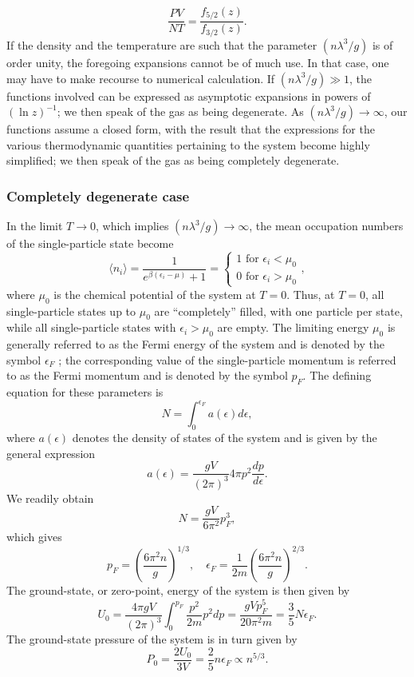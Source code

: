 \[\frac{PV}{NT} = \frac{f_{5/2}(z)}{f_{3/2}(z)}.\]
If the density and the temperature are such that the parameter $(n\lambda^3/g)$ is of order unity, the foregoing expansions cannot be of much use. In that case, one may have to make recourse to numerical calculation.
If $(n\lambda^3/g) \gg 1$, the functions involved can be expressed as asymptotic expansions in powers of $(\ln z)^{-1}$; we then speak of the gas as being degenerate.
As $(n\lambda^3/g) \to \infty$, our functions assume a closed form, with the result that the expressions for the various thermodynamic quantities pertaining to the system become highly simplified; we then speak of the gas as being completely degenerate.

\subsubsection{Completely degenerate case}
In the limit $T \to 0$, which implies $(n\lambda^3/g) \to \infty$, the mean occupation numbers of the single-particle state become
\[\langle n_i \rangle = \frac{1}{e^{\beta(\epsilon_i - \mu)} + 1} = \begin{cases}1 \mbox{ for } \epsilon_i < \mu_0 \\   0 \mbox{ for } \epsilon_i > \mu_0 \end{cases},\]
where $\mu_0$ is the chemical potential of the system at $T = 0$.
Thus, at $T = 0$, all single-particle states up to $\mu_0$ are ``completely'' filled, with one particle per state, while all single-particle states with $\epsilon_i > \mu_0$ are empty. 
The limiting energy $\mu_0$ is generally referred to as the Fermi energy of the system and is denoted by the symbol $\epsilon_F$ ; the corresponding value of the single-particle momentum is referred to as the Fermi momentum and is denoted by the symbol $p_F$. The defining equation for these parameters is
\[N = \int_0^{\epsilon_F} a(\epsilon)d\epsilon,\]
where $a(\epsilon)$ denotes the density of states of the system and is given by the general expression
\[a(\epsilon) = \frac{gV}{(2\pi)^3} 4\pi p^2 \frac{dp}{d\epsilon}.\]
We readily obtain
\[N = \frac{gV}{6\pi^2} p_F^3,\]
which gives
\[p_F = \left( \frac{6\pi^2n}{g} \right)^{1/3} , \quad \epsilon_F = \frac{1}{2m}\left( \frac{6\pi^2n}{g} \right)^{2/3}.\]
The ground-state, or zero-point, energy of the system is then given by
\[U_0 = \frac{4\pi gV}{(2\pi)^3} \int_0^{p_F} \frac{p^2}{2m} p^2 dp = \frac{gVp_F^5}{20\pi^2m} = \frac{3}{5}N\epsilon_F.\]
The ground-state pressure of the system is in turn given by
\[P_0 = \frac{2U_0}{3V} = \frac{2}{5}n\epsilon_F \propto n^{5/3}.\]

